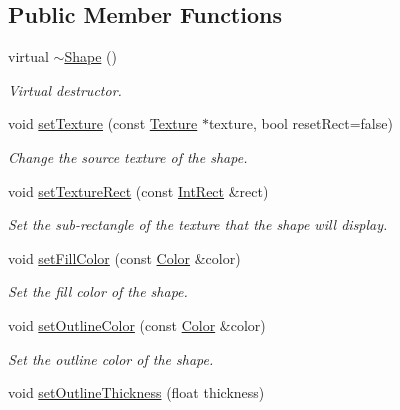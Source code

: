 \subsection*{Public Member Functions}
\begin{DoxyCompactItemize}
\item 
\hypertarget{classsf_1_1_shape_a2262aceb9df52d4275c19633592f19bf}{virtual \hyperlink{classsf_1_1_shape_a2262aceb9df52d4275c19633592f19bf}{$\sim$\+Shape} ()}\label{classsf_1_1_shape_a2262aceb9df52d4275c19633592f19bf}

\begin{DoxyCompactList}\small\item\em Virtual destructor. \end{DoxyCompactList}\item 
void \hyperlink{classsf_1_1_shape_af8fb22bab1956325be5d62282711e3b6}{set\+Texture} (const \hyperlink{classsf_1_1_texture}{Texture} $\ast$texture, bool reset\+Rect=false)
\begin{DoxyCompactList}\small\item\em Change the source texture of the shape. \end{DoxyCompactList}\item 
void \hyperlink{classsf_1_1_shape_a2029cc820d1740d14ac794b82525e157}{set\+Texture\+Rect} (const \hyperlink{classsf_1_1_rect}{Int\+Rect} \&rect)
\begin{DoxyCompactList}\small\item\em Set the sub-\/rectangle of the texture that the shape will display. \end{DoxyCompactList}\item 
void \hyperlink{classsf_1_1_shape_a3506f9b5d916fec14d583d16f23c2485}{set\+Fill\+Color} (const \hyperlink{classsf_1_1_color}{Color} \&color)
\begin{DoxyCompactList}\small\item\em Set the fill color of the shape. \end{DoxyCompactList}\item 
void \hyperlink{classsf_1_1_shape_a5978f41ee349ac3c52942996dcb184f7}{set\+Outline\+Color} (const \hyperlink{classsf_1_1_color}{Color} \&color)
\begin{DoxyCompactList}\small\item\em Set the outline color of the shape. \end{DoxyCompactList}\item 
void \hyperlink{classsf_1_1_shape_a5ad336ad74fc1f567fce3b7e44cf87dc}{set\+Outline\+Thickness} (float thickness)

\end{DoxyCompactItemize}
